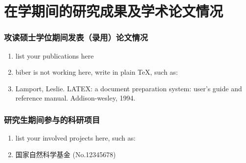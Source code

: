 \chapter{在学期间的研究成果及学术论文情况}

\subsection*{攻读硕士学位期间发表（录用）论文情况}

\begin{enumerate}
  \item list your publications here
  \item biber is not working here, write in plain \TeX, such as:
  \item Lamport, Leslie. LATEX: a document preparation system: user's guide and reference manual. Addison-wesley, 1994.
\end{enumerate}

\subsection*{研究生期间参与的科研项目}

\begin{enumerate}
  \item list your involved projects here, such as:
  \item 国家自然科学基金 (No.12345678)
\end{enumerate}
